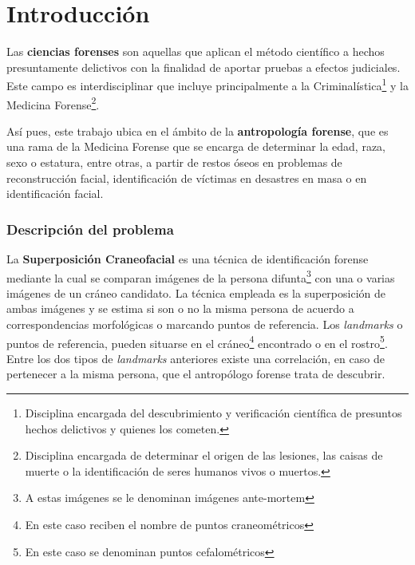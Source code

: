 
\chapter{Introducción}  \label{ch:Introduccion_informatica}


Las \textbf{ciencias forenses} son aquellas que aplican el método científico a hechos presuntamente delictivos con la finalidad de aportar pruebas a efectos judiciales. Este campo es interdisciplinar que incluye principalmente a la Criminalística\footnote{Disciplina encargada del descubrimiento y verificación científica de presuntos hechos delictivos y quienes los cometen.} y la Medicina Forense\footnote{Disciplina encargada de determinar el origen de las lesiones, las caisas de muerte o la identificación de seres humanos vivos o muertos.}. 

\medskip

\noindent Así pues, este trabajo ubica en el ámbito de la \textbf{antropología forense}, que es una rama de la Medicina Forense que se encarga de determinar la edad, raza, sexo o estatura, entre otras, a partir de restos óseos en problemas de reconstrucción facial, identificación de víctimas en desastres en masa o en identificación facial. 


\subsection{Descripción del problema}

La \textbf{Superposición Craneofacial} es una técnica de identificación forense mediante la cual se comparan imágenes de la persona difunta\footnote{A estas imágenes se le denominan imágenes ante-mortem} con una o varias imágenes de un cráneo candidato. La técnica empleada es la superposición de ambas imágenes y se estima si son o no la misma persona de acuerdo a correspondencias morfológicas o marcando puntos de referencia. Los \textit{landmarks} o puntos de referencia, pueden situarse en el cráneo\footnote{En este caso reciben el nombre de puntos craneométricos} encontrado o en el rostro\footnote{En este caso se denominan puntos cefalométricos}. Entre los dos tipos de \textit{landmarks} anteriores existe una correlación, en caso de pertenecer a la misma persona, que el antropólogo forense trata de descubrir. 

